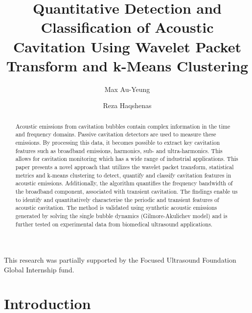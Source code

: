 \documentclass[preprint, linenumbers]{revtex4-2}
\newcommand{\km}{k-means }
\begin{document}
\title[]{Quantitative Detection and Classification of Acoustic Cavitation Using Wavelet Packet Transform and k-Means Clustering}

\author{Max Au-Yeung}
\author{Reza Haqshenas}


\altaffiliation{}


\begin{abstract}
	Acoustic emissions from cavitation bubbles contain complex information in the time and frequency domains. Passive cavitation detectors are used to measure these emissions. By processing this data, it becomes possible to extract key cavitation features such as broadband emissions, harmonics, sub- and ultra-harmonics. This allows for cavitation monitoring which has a wide range of industrial applications. This paper presents a novel approach that utilizes the wavelet packet transform, statistical metrics and \km clustering to detect, quantify and classify cavitation features in acoustic emissions. Additionally, the algorithm quantifies the frequency bandwidth of the broadband component, associated with transient cavitation. The findings enable us to identify and quantitatively characterise the periodic and transient features of acoustic cavitation. The method is validated using synthetic acoustic emissions generated by solving the single bubble dynamics (Gilmore-Akulichev model) and is further tested on experimental data from biomedical ultrasound applications.
\end{abstract}

\maketitle


\begin{acknowledgements}
	This research was partially supported by the Focused Ultrasound Foundation Global Internship fund.
\end{acknowledgements}

\section{Introduction}
\label{sec:intro}
\end{document}
